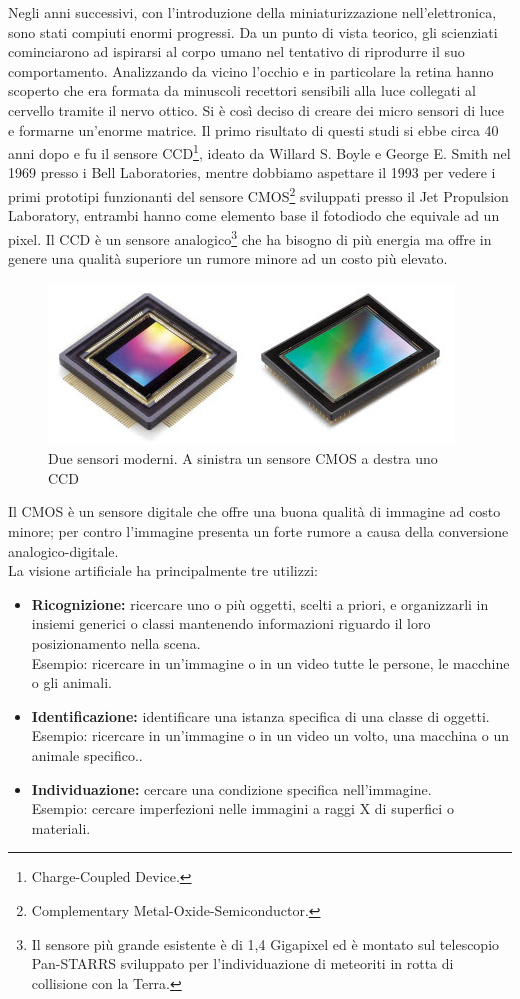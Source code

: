 Negli anni successivi, con l'introduzione della miniaturizzazione nell'elettronica, 
sono stati compiuti enormi progressi. Da un punto di vista teorico, gli scienziati 
cominciarono ad ispirarsi al corpo umano nel tentativo di riprodurre il suo comportamento. Analizzando da vicino
l'occhio e in particolare la retina hanno scoperto che era formata da minuscoli 
recettori sensibili alla luce collegati al cervello tramite il nervo ottico. 
Si è così deciso di creare dei 
micro sensori di luce e formarne un'enorme matrice. Il primo risultato di questi studi 
si ebbe circa 40 anni dopo e fu il sensore CCD\footnote{Charge-Coupled Device.}, 
ideato da Willard S. Boyle e George E. Smith nel 1969 presso i Bell Laboratories,
mentre dobbiamo aspettare il 1993 per vedere i primi prototipi funzionanti del 
sensore CMOS\footnote{Complementary Metal-Oxide-Semiconductor.} sviluppati presso 
il Jet Propulsion Laboratory, entrambi hanno come elemento base il fotodiodo che 
equivale ad un pixel. Il CCD è un sensore 
analogico\footnote{Il sensore più grande esistente è di 1,4 Gigapixel ed è 
montato sul telescopio Pan-STARRS sviluppato per l'individuazione di meteoriti in
 rotta di collisione con la Terra.} che ha bisogno di più energia 
ma offre in genere una qualità superiore un rumore minore ad un costo più elevato.\\
\begin{figure}[!htb] \center
\includegraphics[scale=0.8]{immagini/ccd-cmos.png}
\caption{Due sensori moderni. A sinistra un sensore CMOS a destra uno CCD} 
\end{figure}
Il CMOS è un sensore digitale che offre una buona qualità di immagine ad costo minore;
per contro l'immagine presenta un forte rumore a causa della conversione 
analogico-digitale.\\
La visione artificiale ha principalmente tre utilizzi:
\begin{itemize}
\item \textbf{Ricognizione:} ricercare uno o più oggetti, scelti a priori, e organizzarli in 
insiemi generici o classi mantenendo informazioni riguardo il loro posizionamento 
nella scena. \\Esempio: ricercare in un'immagine o in un video tutte le persone, 
le macchine o gli animali. 
\item \textbf{Identificazione:} identificare una istanza specifica di una classe 
di oggetti. \\Esempio: ricercare in un'immagine o in un video un volto, 
una macchina o un animale specifico.. 
\item \textbf{Individuazione:} cercare una condizione specifica nell'immagine. 
\\Esempio: cercare imperfezioni nelle immagini a raggi X di superfici o materiali.
\end{itemize}
